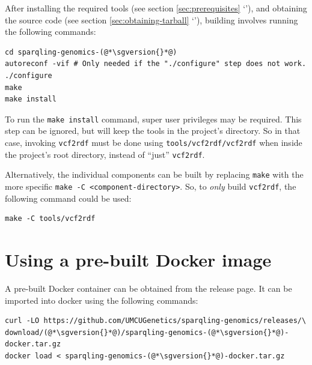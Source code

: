   After installing the required tools (see section \ref{sec:prerequisites}
  {\color{LinkGray}`'}), and obtaining the source
  code (see section \ref{sec:obtaining-tarball} {\color{LinkGray}
    `'}), building involves running the following
  commands:

\begin{siderules}
\begin{lstlisting}
cd sparqling-genomics-(@*\sgversion{}*@)
autoreconf -vif # Only needed if the "./configure" step does not work.
./configure
make
make install
\end{lstlisting}
\end{siderules}

  To run the \texttt{make install} command, super user privileges may be
  required.  This step can be ignored, but will keep the tools in the project's
  directory.  So in that case, invoking \texttt{vcf2rdf} must be done using
  \texttt{tools/vcf2rdf/vcf2rdf} when inside the project's root directory,
  instead of ``just'' \texttt{vcf2rdf}.

  Alternatively, the individual components can be built by replacing
  \texttt{make} with the more specific \texttt{make -C <component-directory>}.
  So, to \emph{only} build \texttt{vcf2rdf}, the following command could be
  used:

\begin{siderules}
\begin{verbatim}
make -C tools/vcf2rdf
\end{verbatim}
\end{siderules}

\section{Using a pre-built Docker image}

  A pre-built Docker container can be obtained from the release page.  It
  can be imported into docker using the following commands:

\begin{siderules}
\begin{lstlisting}
curl -LO https://github.com/UMCUGenetics/sparqling-genomics/releases/\
download/(@*\sgversion{}*@)/sparqling-genomics-(@*\sgversion{}*@)-docker.tar.gz
docker load < sparqling-genomics-(@*\sgversion{}*@)-docker.tar.gz
\end{lstlisting}
\end{siderules}

